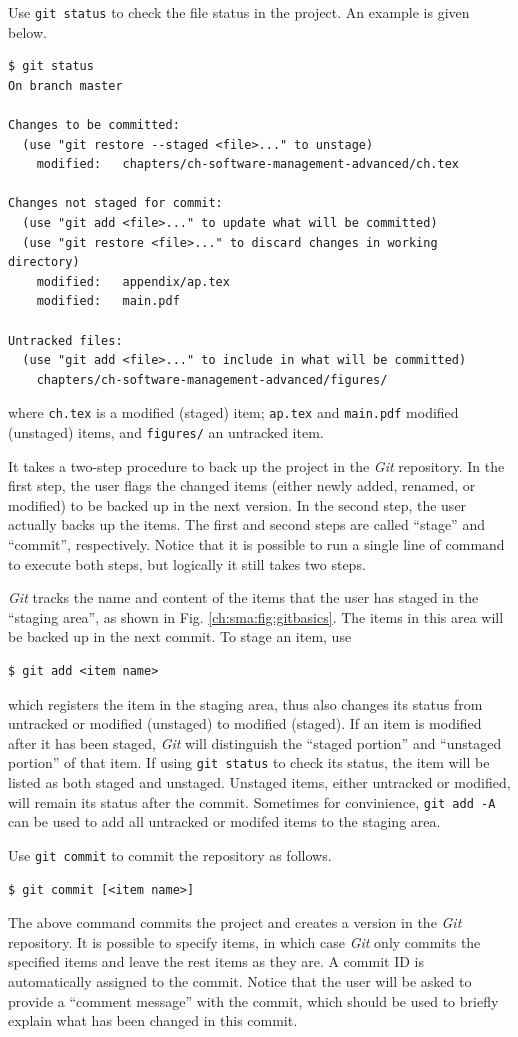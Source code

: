 Use \verb|git status| to check the file status in the project. An example is given below.
\begin{lstlisting}
$ git status
On branch master

Changes to be committed:
  (use "git restore --staged <file>..." to unstage)
	modified:   chapters/ch-software-management-advanced/ch.tex

Changes not staged for commit:
  (use "git add <file>..." to update what will be committed)
  (use "git restore <file>..." to discard changes in working directory)
	modified:   appendix/ap.tex
	modified:   main.pdf

Untracked files:
  (use "git add <file>..." to include in what will be committed)
	chapters/ch-software-management-advanced/figures/
\end{lstlisting}
where \verb|ch.tex| is a modified (staged) item; \verb|ap.tex| and \verb|main.pdf| modified (unstaged) items, and \verb|figures/| an untracked item.

It takes a two-step procedure to back up the project in the \textit{Git} repository. In the first step, the user flags the changed items (either newly added, renamed, or modified) to be backed up in the next version. In the second step, the user actually backs up the items. The first and second steps are called ``stage'' and ``commit'', respectively. Notice that it is possible to run a single line of command to execute both steps, but logically it still takes two steps.

\textit{Git} tracks the name and content of the items that the user has staged in the ``staging area'', as shown in Fig. \ref{ch:sma:fig:gitbasics}. The items in this area will be backed up in the next commit. To stage an item, use
\begin{lstlisting}
$ git add <item name>
\end{lstlisting}
which registers the item in the staging area, thus also changes its status from untracked or modified (unstaged) to modified (staged). If an item is modified after it has been staged, \textit{Git} will distinguish the ``staged portion'' and ``unstaged portion'' of that item. If using \verb|git status| to check its status, the item will be listed as both staged and unstaged. Unstaged items, either untracked or modified, will remain its status after the commit. Sometimes for convinience, \verb|git add -A| can be used to add all untracked or modifed items to the staging area.

Use \verb|git commit| to commit the repository as follows.
\begin{lstlisting}
$ git commit [<item name>]
\end{lstlisting}
The above command commits the project and creates a version in the \textit{Git} repository. It is possible to specify items, in which case \textit{Git} only commits the specified items and leave the rest items as they are. A commit ID is automatically assigned to the commit. Notice that the user will be asked to provide a ``comment message'' with the commit, which should be used to briefly explain what has been changed in this commit.

